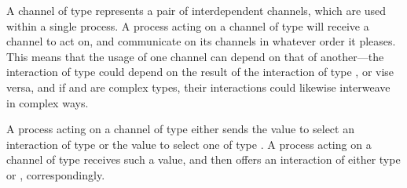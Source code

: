 \documentclass[submission,copyright,creativecommons]{eptcs}
\begin{document}
A channel of type  represents a pair of interdependent channels, which are used within a single process. A process acting on a channel of type  will receive a channel to act on, and communicate on its channels in whatever order it pleases. This means that the usage of one channel can depend on that of another---\eg the interaction of type  could depend on the result of the interaction of type , or vise versa, and if  and  are complex types, their interactions could likewise interweave in complex ways.

A process acting on a channel of type  either sends the value  to select an interaction of type  or the value  to select one of type . 
A process acting on a channel of type  receives such a value, and then offers an interaction of either type  or , correspondingly.
\end{document}
